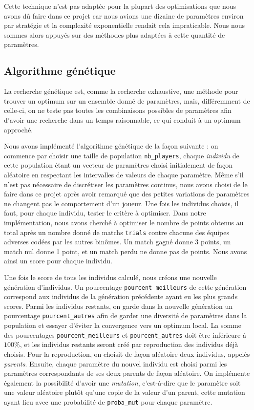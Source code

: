 \documentclass[a4paper,12pt]{article}
\begin{document}
Cette technique n'est pas adaptée pour la plupart des optimisations que nous avons dû faire dans ce projet car nous avions une dizaine de paramètres environ par stratégie et la complexité exponentielle rendait cela impraticable. Nous nous sommes alors appuyés sur des méthodes plus adaptées à cette quantité de paramètres.

\subsection{Algorithme génétique}

La recherche génétique est, comme la recherche exhaustive, une méthode pour trouver un optimum sur un ensemble donné de paramètres, mais, différemment de celle-ci, on ne teste pas toutes les combinaisons possibles de paramètres afin d'avoir une recherche dans un temps raisonnable, ce qui conduit à un optimum approché.

Nous avons implémenté l'algorithme génétique de la façon suivante : on commence par choisir une taille de population \texttt{nb\_players}, chaque \emph{individu} de cette population étant un vecteur de paramètres choisi initialement de façon aléatoire en respectant les intervalles de valeurs de chaque paramètre. Même s'il n'est pas nécessaire de discrétiser les paramètres continus, nous avons choisi de le faire dans ce projet après avoir remarqué que des petites variations de paramètres ne changent pas le comportement d'un joueur. Une fois les individus choisis, il faut, pour chaque individu, tester le critère à optimiser. Dans notre implémentation, nous avons cherché à optimiser le nombre de points obtenus au total après un nombre donné de matchs \texttt{trials} contre chacune des équipes adverses codées par les autres binômes. Un match gagné donne 3 points, un match nul donne 1 point, et un match perdu ne donne pas de points. Nous avons ainsi un score pour chaque individu.

Une fois le score de tous les individus calculé, nous créons une nouvelle génération d'individus. Un pourcentage \texttt{pourcent\_meilleurs} de cette génération correspond aux individus de la génération précédente ayant eu les plus grands scores. Parmi les individus restants, on garde dans la nouvelle génération un pourcentage \texttt{pourcent\_autres} afin de garder une diversité de paramètres dans la population et essayer d'éviter la convergence vers un optimum local. La somme des pourcentages \texttt{pourcent\_meilleurs} et \texttt{pourcent\_autres} doit être inférieure à $100 \%$, et les individus restants seront créé par reproduction des individus déjà choisis. Pour la reproduction, on choisit de façon aléatoire deux individus, appelés \emph{parents}. Ensuite, chaque paramètre du nouvel individu est choisi parmi les paramètres correspondants de ses deux parents de façon aléatoire. On implémente également la possibilité d'avoir une \emph{mutation}, c'est-à-dire que le paramètre soit une valeur aléatoire plutôt qu'une copie de la valeur d'un parent, cette mutation ayant lieu avec une probabilité de \texttt{proba\_mut} pour chaque paramètre.
\end{document}
